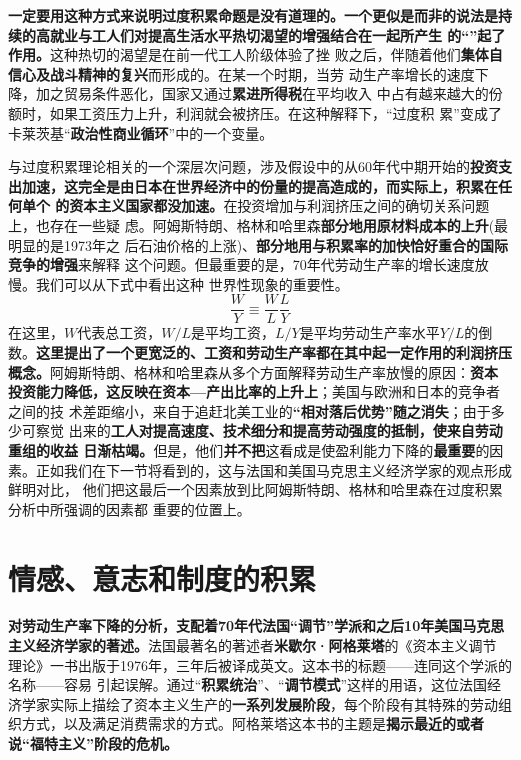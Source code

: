 \textbf{一定要用这种方式来说明过度积累命题是没有道理的。一个更似是而非的说法是持
  续的高就业与工人们对提高生活水平热切渴望的增强结合在一起所产生
  的“”起了作用。}这种热切的渴望是在前一代工人阶级体验了挫
败之后，伴随着他们\textbf{集体自信心及战斗精神的复兴}而形成的。在某一个时期，当劳
动生产率增长的速度下降，加之贸易条件恶化，国家又通过\textbf{累进所得税}在平均收入
中占有越来越大的份额时，如果工资压力上升，利润就会被挤压。在这种解释下，“过度积
累”变成了卡莱茨基“\textbf{政治性商业循环}”中的一个变量。

与过度积累理论相关的一个深层次问题，涉及假设中的从60年代中期开始的\textbf{投资支
  出加速，这完全是由日本在世界经济中的份量的提高造成的，而实际上，积累在任何单个
  的资本主义国家都没加速。}在投资增加与利润挤压之间的确切关系问题上，也存在一些疑
虑。阿姆斯特朗、格林和哈里森\textbf{部分地用原材料成本的上升}(最明显的是1973年之
后石油价格的上涨)、\textbf{部分地用与积累率的加快恰好重合的国际竞争的增强}来解释
这个问题。但最重要的是，70年代劳动生产率的增长速度放慢。我们可以从下式中看出这种
世界性现象的重要性。
\begin{equation}
  \label{eq:weiji3}
\frac{W}{Y}≡\frac{W}{L} \frac{L}{Y}
\end{equation}
在这里，$W$代表总工资，$W/ L$是平均工资，$L/Y$是平均劳动生产率水平$Y/L$的倒
数。\textbf{这里提出了一个更宽泛的、工资和劳动生产率都在其中起一定作用的利润挤压
  概念。}阿姆斯特朗、格林和哈里森从多个方面解释劳动生产率放慢的原因：\textbf{资本
  投资能力降低，这反映在资本—产出比率的上升上}；美国与欧洲和日本的竞争者之间的技
术差距缩小，来自于追赶北美工业的\textbf{“相对落后优势”随之消失}；由于多少可察觉
出来的\textbf{工人对提高速度、技术细分和提高劳动强度的抵制，使来自劳动重组的收益
  日渐枯竭。}但是，他们\textbf{并不把}这看成是使盈利能力下降的\textbf{最重要}的因
素。正如我们在下一节将看到的，这与法国和美国马克思主义经济学家的观点形成鲜明对比，
他们把这最后一个因素放到比阿姆斯特朗、格林和哈里森在过度积累分析中所强调的因素都
重要的位置上。

\section{情感、意志和制度的积累}

\textbf{对劳动生产率下降的分析，支配着70年代法国“调节”学派和之后10年美国马克思
  主义经济学家的著述。}法国最著名的著述者\textbf{米歇尔·阿格莱塔}的《资本主义调节
理论》一书出版于1976年，三年后被译成英文。这本书的标题——连同这个学派的名称——容易
引起误解。通过“\textbf{积累统治}”、“\textbf{调节模式}”这样的用语，这位法国经
济学家实际上描绘了资本主义生产的\textbf{一系列发展阶段}，每个阶段有其特殊的劳动组
织方式，以及满足消费需求的方式。阿格莱塔这本书的主题是\textbf{揭示最近的或者
  说“福特主义”阶段的危机。}

